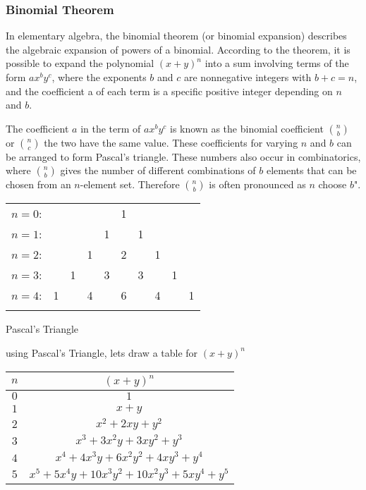 \subsubsection{Binomial Theorem}

In elementary algebra, the binomial theorem (or binomial expansion) describes the algebraic expansion of powers of a binomial. According to the theorem, it is possible to expand the polynomial $(x + y)^n$ into a sum involving terms of the form $ax^{b}y^{c}$, where the exponents $b$ and $c$ are nonnegative integers with $b + c = n$, and the coefficient a of each term is a specific positive integer depending on $n$ and $b$.

The coefficient $a$ in the term of $ax^{b}y^{c}$ 
is known as the binomial coefficient $\binom{n}{b}$ or $\binom{n}{c}$ 
the two have the same value. 
These coefficients for varying $n$ and $b$ can be arranged to form Pascal's triangle. 
These numbers also occur in combinatorics, where $\binom {n}{b}$ 
gives the number of different combinations of $b$ elements that can be chosen from an $n$-element set. 
Therefore $\binom{n}{b}$ is often pronounced as $n$ choose $b$".


\begin{center}
\begin{tabular}{rccccccccc}
    $n=0$:&    &    &    &    &  1\\\noalign{\smallskip\smallskip}
    $n=1$:&    &    &    &  1 &    &  1\\\noalign{\smallskip\smallskip}
    $n=2$:&    &    &  1 &    &  2 &    &  1\\\noalign{\smallskip\smallskip}
    $n=3$:&    &  1 &    &  3 &    &  3 &    &  1\\\noalign{\smallskip\smallskip}
    $n=4$:&  1 &    &  4 &    &  6 &    &  4 &    &  1\\\noalign{\smallskip\smallskip}    
\end{tabular}
\end{center}

\begin{center}
    Pascal's Triangle
\end{center}

using Pascal's Triangle, lets draw a table for $(x+y)^n$

    \begin{center}
    \begin{tabular}{|c|c|}    
        \hline	
        $n$ & $(x + y)^n$ \\ \hline
        $0$ & $1$ \\ \hline
        $1$ & $x+y$ \\ \hline
        $2$ & $x^2+2xy+y^2$ \\ \hline
        $3$ & $x^3+3x^2y+3xy^2+y^3$ \\ \hline
        $4$ & $x^4+4x^3y+6x^2y^2+4xy^3+y^4$ \\ \hline
        $5$ & $x^5+5x^4y+10x^3y^2+10x^2y^3+5xy^4+y^5$ \\ \hline
 
    \end{tabular}
    \end{center}

